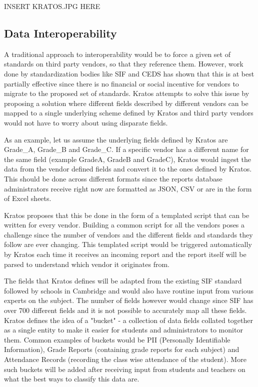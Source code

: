 \documentclass{article}
\begin{document}
INSERT KRATOS.JPG HERE
\subsection{Data Interoperability}
A traditional approach to interoperability would be to force a given set of standards on third party vendors, so that they reference them. However, work done by standardization bodies like SIF and CEDS has shown that this is at best partially effective since there is no financial or social incentive for vendors to migrate to the proposed set of standards. Kratos attempts to solve this issue by proposing a solution where different fields described by different vendors can be mapped to a single underlying scheme defined by Kratos and third party vendors would not have to worry about using disparate fields.

\bigbreak
As an example, let us assume the underlying fields defined by Kratos are Grade\_A, Grade\_B and Grade\_C. If a specific vendor has a different name for the same field (example GradeA, GradeB and GradeC), Kratos would ingest the data from the vendor defined fields and convert it to the ones defined by Kratos. This should be done across different formats since the reports database administrators receive right now are formatted as JSON, CSV or are in the form of Excel sheets.

\bigbreak
Kratos proposes that this be done in the form of a templated script that can be written for every vendor. Building a common script for all the vendors poses a challenge since the number of vendors and the different fields and standards they follow are ever changing. This templated script would be triggered automatically by Kratos each time it receives an incoming report and the report itself will be parsed to understand which vendor it originates from.

\bigbreak
The fields that Kratos defines will be adapted from the existing SIF standard followed by schools in Cambridge and would also have routine input from various experts on the subject. The number of fields however would change since SIF has over 700 different fields and it is not possible to accurately map all these fields. Kratos defines the idea of a "bucket" - a collection of data fields collated together as a single entity to make it easier for students and administrators to monitor them. Common examples of buckets would be PII (Personally Identifiable Information), Grade Reports (containing grade reports for each subject) and Attendance Records (recording the class wise attendance of the student). More such buckets will be added after receiving input from students and teachers on what the best ways to classify this data are.
\end{document}
